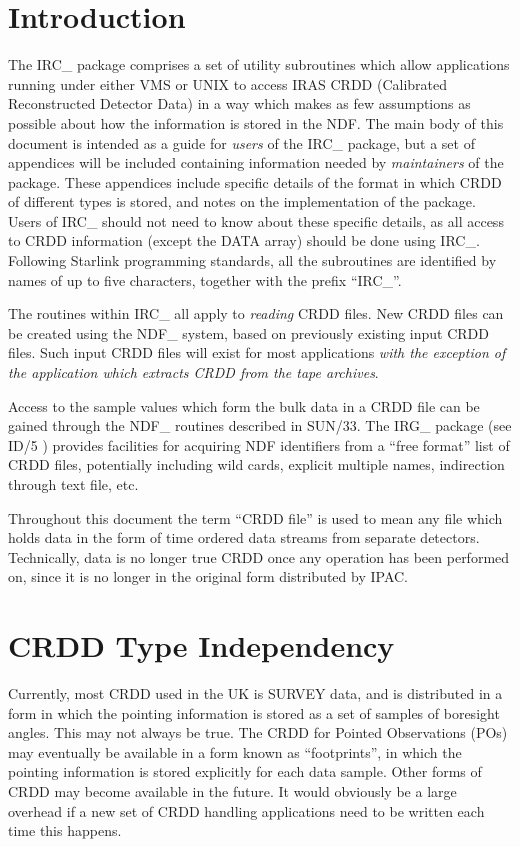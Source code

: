 \section {Introduction}
The IRC\_ package comprises a set of utility subroutines which allow
applications running under either VMS or UNIX to access IRAS CRDD (Calibrated
Reconstructed Detector Data) in a way which makes as few assumptions as possible
about how the information is stored in the NDF. The main body of this document
is intended as a guide for {\em users } of the IRC\_ package, but a set of
appendices will be included containing information needed by {\em maintainers }
of the package. These appendices include specific details of the format in which
CRDD of different types is stored, and notes on the implementation of the
package. Users of IRC\_ should not need to know about these specific details, as
all access to CRDD information (except the DATA array) should be done
using IRC\_. Following Starlink programming standards, all the subroutines are
identified by names of up to five characters, together with the prefix
``IRC\_''. 

The routines within IRC\_ all apply to {\em reading } CRDD files. New CRDD files
can be created using the NDF\_ system, based on previously existing input CRDD
files. Such input CRDD files will exist for most applications {\em with the
exception of the application which extracts CRDD from the tape archives}. 

Access to the sample values which form the bulk data in a CRDD file can be
gained through the NDF\_ routines described in 
SUN/33. The IRG\_ package (see ID/5 ) provides facilities for acquiring NDF 
identifiers from a ``free format'' list of CRDD files, potentially including wild 
cards, explicit multiple names, indirection through text file, etc.

Throughout this document the term ``CRDD file'' is used to mean any file which 
holds data in the form of time ordered data streams from separate detectors. 
Technically, data is no longer true CRDD once any operation has been performed 
on, since it is no longer in the original form distributed by IPAC.

\section {CRDD Type Independency}
\label {SEC:INDEP}
Currently, most CRDD used in the UK is SURVEY data, and is distributed in a form
in which the pointing information is stored as a set of samples of boresight
angles. This may not always be true. The CRDD for Pointed Observations
(POs) may eventually be available in a form known as ``footprints'', in
which the pointing information is stored explicitly for each data sample. Other
forms of CRDD may become available in the future. It would obviously be a large
overhead if a new set of CRDD handling applications need to be written each 
time this happens. 

